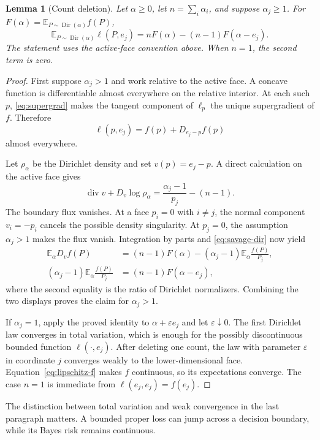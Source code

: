 \documentclass{article}
\newtheorem{lemma}[theorem]{Lemma}
\theoremstyle{definition}
\theoremstyle{remark}
\newcommand{\E}{\mathbb E}
\newcommand{\Dir}{\operatorname{Dir}}
\begin{document}
\begin{lemma}[Count deletion]\label{lem:identity}
Let $\alpha\geq0$, let $n=\sum_i\alpha_i$, and suppose $\alpha_j\geq1$. For $F(\alpha)=\E_{P\sim\Dir(\alpha)}f(P)$, \[ \E_{P\sim\Dir(\alpha)}\ell(P,e_j) =nF(\alpha)-(n-1)F(\alpha-e_j). \] The statement uses the active-face convention above.  When $n=1$, the second term is zero.
\end{lemma}

\begin{proof}
First suppose $\alpha_j>1$ and work relative to the active face.  A concave function is differentiable almost everywhere on the relative interior. At each such $p$, \eqref{eq:supergrad} makes the tangent component of $\ell_p$ the unique supergradient of $f$.  Therefore
\begin{equation}
 \ell(p,e_j)=f(p)+D_{e_j-p}f(p)                \tag{5}\label{eq:savage-dir}
\end{equation}
almost everywhere.

Let $\rho_\alpha$ be the Dirichlet density and set $v(p)=e_j-p$.  A direct calculation on the active face gives \[ \operatorname{div}v+D_v\log\rho_\alpha =\frac{\alpha_j-1}{p_j}-(n-1). \] The boundary flux vanishes.  At a face $p_i=0$ with $i\neq j$, the normal component $v_i=-p_i$ cancels the possible density singularity.  At $p_j=0$, the assumption $\alpha_j>1$ makes the flux vanish.  Integration by parts and \eqref{eq:savage-dir} now yield
\begin{align*}
 \E_\alpha D_vf(P)
 &=(n-1)F(\alpha)
   -(\alpha_j-1)\E_\alpha\frac{f(P)}{P_j},\\
 (\alpha_j-1)\E_\alpha\frac{f(P)}{P_j}
 &=(n-1)F(\alpha-e_j),
\end{align*}
where the second equality is the ratio of Dirichlet normalizers.  Combining the two displays proves the claim for $\alpha_j>1$.

If $\alpha_j=1$, apply the proved identity to $\alpha+\varepsilon e_j$ and let $\varepsilon\downarrow0$.  The first Dirichlet law converges in total variation, which is enough for the possibly discontinuous bounded function $\ell(\cdot,e_j)$.  After deleting one count, the law with parameter $\varepsilon$ in coordinate $j$ converges weakly to the lower-dimensional face.  Equation~\eqref{eq:lipschitz-f} makes $f$ continuous, so its expectations converge.  The case $n=1$ is immediate from $\ell(e_j,e_j)=f(e_j)$.
\end{proof}

The distinction between total variation and weak convergence in the last paragraph matters.  A bounded proper loss can jump across a decision boundary, while its Bayes risk remains continuous.
\end{document}
